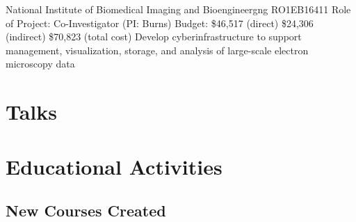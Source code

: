 \documentclass[10pt,colorlinks=true,urlcolor=blue]{moderncv}
\begin{document}
{\newline National Institute of Biomedical Imaging and Bioengineergng RO1EB16411
\newline Role of Project: Co-Investigator (PI: Burns)
\newline Budget: \$46,517 (direct) \$24,306 (indirect) \$70,823 (total cost)
\newline Develop cyberinfrastructure to support management, visualization, storage, and analysis
of large-scale electron microscopy data}{}{}{}{}

\section{Talks}
\begin{refsection}
\nocite{*}
\printbibliography[%
    title=\href{https://neurodata.io/talks/}{Invited Talks (Local)},%
    heading=subbibliography%
    ]
\end{refsection}


\begin{refsection}
\nocite{*}
\printbibliography[%
    title=\href{https://neurodata.io/talks/}{Invited Talks (International)},%
    heading=subbibliography%
    ]
\end{refsection}


\begin{refsection}[posters]
\nocite{*}
\printbibliography[%
    title=\href{https://neurodata.io/posters/}{Abstracts / Posters},%
    heading=bibliography%
    ]
\end{refsection}





\section{Educational Activities}
\subsection{New Courses Created}


\end{document}
